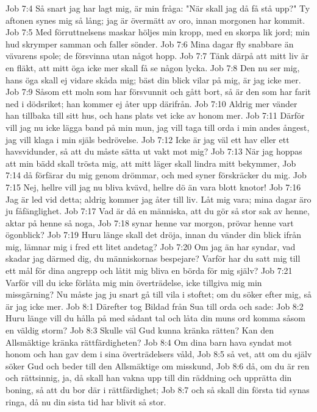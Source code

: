 Job 7:4  Så snart jag har lagt mig, är min fråga: "När skall jag då få stå upp?" Ty aftonen synes mig så lång; jag är övermätt av oro, innan morgonen har kommit.
Job 7:5  Med förruttnelsens maskar höljes min kropp, med en skorpa lik jord; min hud skrymper samman och faller sönder.
Job 7:6  Mina dagar fly snabbare än vävarens spole; de försvinna utan något hopp.
Job 7:7  Tänk därpå att mitt liv är en fläkt, att mitt öga icke mer skall få se någon lycka.
Job 7:8  Den nu ser mig, hans öga skall ej vidare skåda mig; bäst din blick vilar på mig, är jag icke mer.
Job 7:9  Såsom ett moln som har försvunnit och gått bort, så är den som har farit ned i dödsriket; han kommer ej åter upp därifrån.
Job 7:10  Aldrig mer vänder han tillbaka till sitt hus, och hans plats vet icke av honom mer.
Job 7:11  Därför vill jag nu icke lägga band på min mun, jag vill taga till orda i min andes ångest, jag vill klaga i min själs bedrövelse.
Job 7:12  Icke är jag väl ett hav eller ett havsvidunder, så att du måste sätta ut vakt mot mig?
Job 7:13  När jag hoppas att min bädd skall trösta mig, att mitt läger skall lindra mitt bekymmer,
Job 7:14  då förfärar du mig genom drömmar, och med syner förskräcker du mig.
Job 7:15  Nej, hellre vill jag nu bliva kvävd, hellre dö än vara blott knotor!
Job 7:16  Jag är led vid detta; aldrig kommer jag åter till liv. Låt mig vara; mina dagar äro ju fåfänglighet.
Job 7:17  Vad är då en människa, att du gör så stor sak av henne, aktar på henne så noga,
Job 7:18  synar henne var morgon, prövar henne vart ögonblick?
Job 7:19  Huru länge skall det dröja, innan du vänder din blick ifrån mig, lämnar mig i fred ett litet andetag?
Job 7:20  Om jag än har syndar, vad skadar jag därmed dig, du människornas bespejare? Varför har du satt mig till ett mål för dina angrepp och låtit mig bliva en börda för mig själv?
Job 7:21  Varför vill du icke förlåta mig min överträdelse, icke tillgiva mig min missgärning? Nu måste jag ju snart gå till vila i stoftet; om du söker efter mig, så är jag icke mer.
Job 8:1  Därefter tog Bildad från Sua till orda och sade:
Job 8:2  Huru länge vill du hålla på med sådant tal och låta din muns ord komma såsom en väldig storm?
Job 8:3  Skulle väl Gud kunna kränka rätten? Kan den Allsmäktige kränka rättfärdigheten?
Job 8:4  Om dina barn hava syndat mot honom och han gav dem i sina överträdelsers våld,
Job 8:5  så vet, att om du själv söker Gud och beder till den Allsmäktige om misskund,
Job 8:6  då, om du är ren och rättsinnig, ja, då skall han vakna upp till din räddning och upprätta din boning, så att du bor där i rättfärdighet;
Job 8:7  och så skall din första tid synas ringa, då nu din sista tid har blivit så stor.
